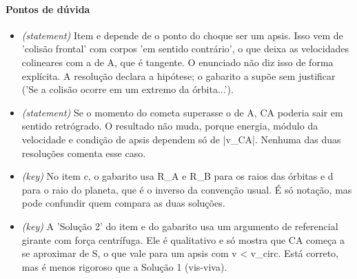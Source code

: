 \documentclass{article}%
\begin{document}
\paragraph{Pontos de dúvida}%
\begin{itemize}%
\item%
\textit{(statement)} Item e depende de o ponto do choque ser um apsis. Isso vem de 'colisão frontal' com corpos 'em sentido contrário', o que deixa as velocidades colineares com a de A, que é tangente. O enunciado não diz isso de forma explícita. A resolução declara a hipótese; o gabarito a supõe sem justificar ('Se a colisão ocorre em um extremo da órbita...').%
\item%
\textit{(statement)} Se o momento do cometa superasse o de A, CA poderia sair em sentido retrógrado. O resultado não muda, porque energia, módulo da velocidade e condição de apsis dependem só de |v\_CA|. Nenhuma das duas resoluções comenta esse caso.%
\item%
\textit{(key)} No item c, o gabarito usa R\_A e R\_B para os raios das órbitas e d para o raio do planeta, que é o inverso da convenção usual. É só notação, mas pode confundir quem compara as duas soluções.%
\item%
\textit{(key)} A 'Solução 2' do item e do gabarito usa um argumento de referencial girante com força centrífuga. Ele é qualitativo e só mostra que CA começa a se aproximar de S, o que vale para um apsis com v < v\_circ. Está correto, mas é menos rigoroso que a Solução 1 (vis{-}viva).%
\end{itemize}%
\end{document}
